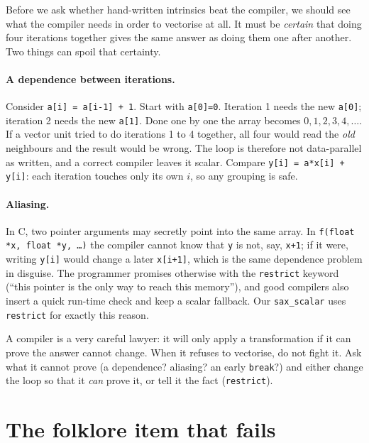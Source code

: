 Before we ask whether hand-written intrinsics beat the compiler, we
should see what the compiler needs in order to vectorise at all. It
must be \emph{certain} that doing four iterations together gives the
same answer as doing them one after another. Two things can spoil that
certainty.

\paragraph{A dependence between iterations.} Consider
\texttt{a[i] = a[i-1] + 1}. Start with \texttt{a[0]=0}. Iteration 1
needs the new \texttt{a[0]}; iteration 2 needs the new \texttt{a[1]}.
Done one by one the array becomes $0,1,2,3,4,\dots$. If a vector unit
tried to do iterations 1 to 4 together, all four would read the
\emph{old} neighbours and the result would be wrong. The loop is
therefore not data-parallel as written, and a correct compiler leaves it
scalar. Compare \texttt{y[i] = a*x[i] + y[i]}: each iteration touches
only its own $i$, so any grouping is safe.

\paragraph{Aliasing.} In C, two pointer arguments may secretly point
into the same array. In \texttt{f(float *x, float *y, \dots)} the
compiler cannot know that \texttt{y} is not, say, \texttt{x+1}; if it
were, writing \texttt{y[i]} would change a later \texttt{x[i+1]}, which is
the same dependence problem in disguise. The programmer promises
otherwise with the \texttt{restrict} keyword (``this pointer is the only
way to reach this memory''), and good compilers also insert a quick
run-time check and keep a scalar fallback. Our \texttt{sax\_scalar}
uses \texttt{restrict} for exactly this reason.

\begin{principle}
A compiler is a very careful lawyer: it will only apply a transformation
if it can prove the answer cannot change. When it refuses to vectorise,
do not fight it. Ask what it cannot prove (a dependence? aliasing? an
early \texttt{break}?) and either change the loop so that it \emph{can}
prove it, or tell it the fact (\texttt{restrict}).
\end{principle}

\section{The folklore item that fails}


